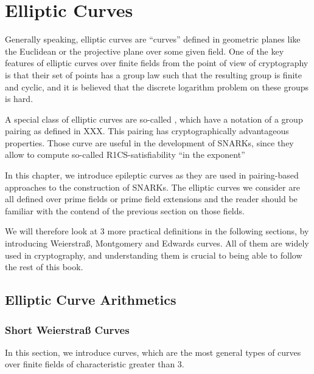 \chapter{Elliptic Curves}\label{chap:elliptic-curves}
\label{chap:elliptic_curves}
Generally speaking, elliptic curves are ``curves'' defined in geometric planes like the Euclidean or the projective plane over some given field. One of the key features of elliptic curves over finite fields from the point of view of cryptography is that their set of points has a group law such that the resulting group is finite and cyclic, and it is believed that the discrete logarithm problem on these groups is hard. 

A special class of elliptic curves are so-called , which have a notation of a group pairing as defined in XXX. This pairing has cryptographically advantageous properties. Those curve are useful in the development of SNARKs, since they allow to compute so-called R1CS-satisfiability ``in the exponent'' 

In this chapter, we introduce epileptic curves as they are used in pairing-based approaches to the construction of SNARKs. The elliptic curves we consider are all defined over prime fields or prime field extensions and the reader should be familiar with the contend of the previous section on those fields.

 We will therefore look at $3$ more practical definitions in the following sections, by introducing Weierstraß, Montgomery and Edwards curves. All of them are widely used in cryptography, and understanding them is crucial to being able to follow the rest of this book.

\section{Elliptic Curve Arithmetics}

\subsection{Short Weierstraß Curves}
\label{sec:short_weierstrass_curve}
In this section, we introduce curves, which are the most general types of curves over finite fields of characteristic greater than $3$. 

